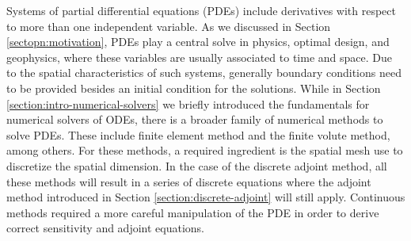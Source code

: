 Systems of partial differential equations (PDEs) include derivatives with respect to more than one independent variable. 
As we discussed in Section \ref{sectopn:motivation}, PDEs play a central solve in physics, optimal design, and geophysics, where these variables are usually associated to time and space. 
Due to the spatial characteristics of such systems, generally boundary conditions need to be provided besides an initial condition for the solutions. 
While in Section \ref{section:intro-numerical-solvers} we briefly introduced the fundamentals for numerical solvers of ODEs, there is a broader family of numerical methods to solve PDEs. 
These include finite element method and the finite volute method, among others. 
For these methods, a required ingredient is the spatial mesh use to discretize the spatial dimension. 
In the case of the discrete adjoint method, all these methods will result in a series of discrete equations where the adjoint method introduced in Section \ref{section:discrete-adjoint} will still apply. 
Continuous methods required a more careful manipulation of the PDE in order to derive correct sensitivity and adjoint equations. 

